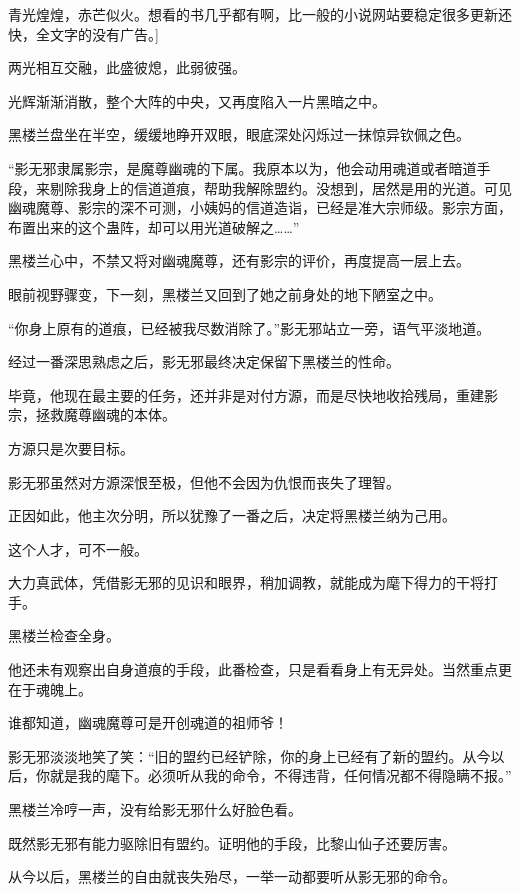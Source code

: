 
\begin{this_body}

青光煌煌，赤芒似火。想看的书几乎都有啊，比一般的小说网站要稳定很多更新还快，全文字的没有广告。]

两光相互交融，此盛彼熄，此弱彼强。

光辉渐渐消散，整个大阵的中央，又再度陷入一片黑暗之中。

黑楼兰盘坐在半空，缓缓地睁开双眼，眼底深处闪烁过一抹惊异钦佩之色。

“影无邪隶属影宗，是魔尊幽魂的下属。我原本以为，他会动用魂道或者暗道手段，来剔除我身上的信道道痕，帮助我解除盟约。没想到，居然是用的光道。可见幽魂魔尊、影宗的深不可测，小姨妈的信道造诣，已经是准大宗师级。影宗方面，布置出来的这个蛊阵，却可以用光道破解之……”

黑楼兰心中，不禁又将对幽魂魔尊，还有影宗的评价，再度提高一层上去。

眼前视野骤变，下一刻，黑楼兰又回到了她之前身处的地下陋室之中。

“你身上原有的道痕，已经被我尽数消除了。”影无邪站立一旁，语气平淡地道。

经过一番深思熟虑之后，影无邪最终决定保留下黑楼兰的性命。

毕竟，他现在最主要的任务，还并非是对付方源，而是尽快地收拾残局，重建影宗，拯救魔尊幽魂的本体。

方源只是次要目标。

影无邪虽然对方源深恨至极，但他不会因为仇恨而丧失了理智。

正因如此，他主次分明，所以犹豫了一番之后，决定将黑楼兰纳为己用。

这个人才，可不一般。

大力真武体，凭借影无邪的见识和眼界，稍加调教，就能成为麾下得力的干将打手。

黑楼兰检查全身。

他还未有观察出自身道痕的手段，此番检查，只是看看身上有无异处。当然重点更在于魂魄上。

谁都知道，幽魂魔尊可是开创魂道的祖师爷！

影无邪淡淡地笑了笑：“旧的盟约已经铲除，你的身上已经有了新的盟约。从今以后，你就是我的麾下。必须听从我的命令，不得违背，任何情况都不得隐瞒不报。”

黑楼兰冷哼一声，没有给影无邪什么好脸色看。

既然影无邪有能力驱除旧有盟约。证明他的手段，比黎山仙子还要厉害。

从今以后，黑楼兰的自由就丧失殆尽，一举一动都要听从影无邪的命令。


\end{this_body}
